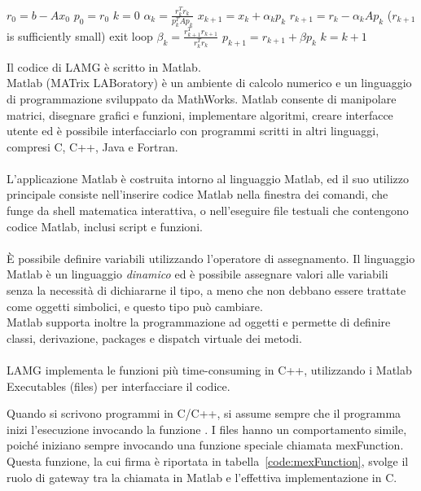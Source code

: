 \begin{algorithm}
\caption{$x = CG(x_0,A,b)$}\label{alg:CG}
\begin{algorithmic}[1]
\State $r_0 = b -Ax_0$
\State $p_0 = r_0$
\State $k=0$
\Loop
	\State $\alpha_k = \frac{r_k^Tr_k}{p_k^TAp_k}$
	\State $x_{k+1} = x_k + \alpha_kp_k$
	\State $r_{k+1} = r_k - \alpha_kAp_k$
	\If ($r_{k+1}$ is sufficiently small)
		\State exit loop
	\EndIf
	\State $\beta_k = \frac{r_{k+1}^Tr_{k+1} }{r_k^Tr_k }$
	\State $p_{k+1} = r_{k+1} + \beta p_k$
	\State $k = k+1$
\EndLoop
\end{algorithmic}
\end{algorithm}


Il codice di LAMG è scritto in Matlab.
\\
Matlab (MATrix LABoratory) è un ambiente di calcolo numerico e un linguaggio di programmazione sviluppato da MathWorks. 
Matlab consente di manipolare matrici, disegnare grafici e funzioni, implementare algoritmi, creare interfacce utente ed è possibile interfacciarlo con programmi scritti in altri linguaggi, compresi C, C++, Java e Fortran.\\
\\
L'applicazione Matlab è costruita intorno al linguaggio Matlab, ed il suo utilizzo principale consiste nell'inserire codice Matlab nella finestra dei comandi, che funge da shell matematica interattiva, o nell'eseguire file testuali che contengono codice Matlab, inclusi script e funzioni.\\
\\
È possibile definire variabili utilizzando l'operatore di assegnamento.
Il linguaggio Matlab è un linguaggio \emph{dinamico} ed è possibile assegnare valori alle variabili senza la necessità di dichiararne il tipo, a meno che non debbano essere trattate come oggetti simbolici, e questo tipo può cambiare.\\
Matlab supporta inoltre la programmazione ad oggetti e permette di definire classi, derivazione, packages e dispatch virtuale dei metodi.\\
\\
LAMG implementa le funzioni più time-consuming in C++, utilizzando i Matlab Executables (\mex files) per interfacciare il codice.

Quando si scrivono programmi in C/C++, si assume sempre che il programma inizi l'esecuzione invocando la funzione . I \mex files hanno un comportamento simile, poiché iniziano sempre invocando una funzione speciale chiamata mexFunction.
Questa funzione, la cui firma è riportata in tabella~\vref{code:mexFunction}, svolge il ruolo di gateway tra la chiamata in Matlab e l'effettiva implementazione in C.

